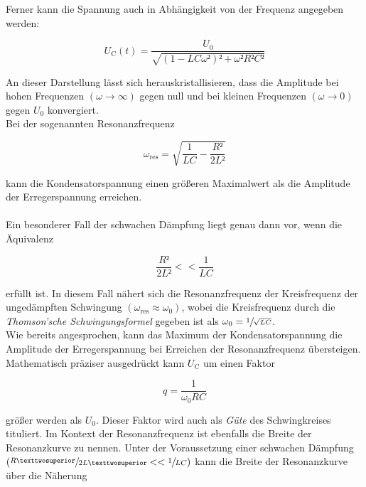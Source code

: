 \noindent Ferner kann die Spannung auch in Abhängigkeit von der Frequenz angegeben werden:

\begin{equation*}
    U_\text{C}(t) = \frac{U_0}{\sqrt{\left(1 - LC\omega²\right)² + \omega²R²C²}}
\end{equation*}

\noindent An dieser Darstellung lässt sich herauskristallisieren, dass die Amplitude bei hohen Frequenzen 
$\left(\omega \rightarrow \infty\right)$ gegen null und bei kleinen Frequenzen $\left(\omega \rightarrow 0\right)$ 
gegen $U_0$ konvergiert. \\
Bei der sogenannten Resonanzfrequenz 

\begin{equation*}
    \omega_\text{res} = \sqrt{\frac{1}{LC} - \frac{R²}{2L²}}
\end{equation*}

\noindent kann die Kondensatorspannung einen größeren Maximalwert als die Amplitude der Erregerspannung erreichen.\\\\
Ein besonderer Fall der schwachen Dämpfung liegt genau dann vor, wenn die Äquivalenz  

\begin{equation*}
    \frac{R²}{2L²} << \frac{1}{LC}
\end{equation*}

\noindent erfüllt ist. In diesem Fall nähert sich die Resonanzfrequenz der Kreisfrequenz der ungedämpften Schwingung
$(\omega_\text{res} \approx \omega_0)$, wobei die Kreisfrequenz durch die \emph{Thomson'sche Schwingungsformel}\cite{Thomson}
gegeben ist als $\omega_0 = \sfrac{1}{\sqrt{LC}}$.\\
Wie bereits angesprochen, kann das Maximum der Kondensatorspannung die Amplitude der Erregerspannung bei Erreichen der 
Resonanzfrequenz übersteigen. Mathematisch präziser ausgedrückt kann $U_\text{C}$ um einen Faktor

\begin{equation}
    q = \frac{1}{\omega_{0}RC}
    \label{eqn:güte}
\end{equation}

\noindent größer werden als $U_0$. Dieser Faktor wird auch als \emph{Güte} des Schwingkreises tituliert. Im Kontext der Resonanzfrequenz ist 
ebenfalls die Breite der Resonanzkurve zu nennen. Unter der Voraussetzung einer schwachen Dämpfung $\left(\sfrac{R²}{2L²} << \sfrac{1}{LC}\right)$
kann die Breite der Resonanzkurve über die Näherung


